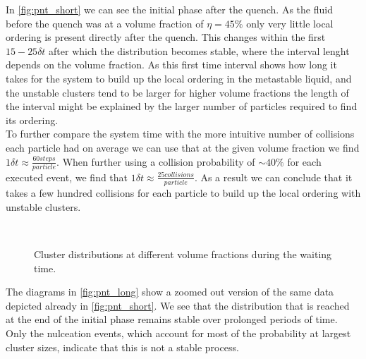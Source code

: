 In \autoref{fig:pnt_short} we can see the initial phase after the quench. As the fluid before the quench was at a volume fraction of $\eta=45\%$ only very little local ordering is present directly after the quench. This changes within the first $15 -25 \delta t$ after which the distribution becomes stable, where the interval lenght depends on the volume fraction. As this first time interval shows how long it takes for the system to build up the local ordering in the metastable liquid, and the unstable clusters tend to be larger for higher volume fractions the length of the interval might be explained by the larger number of particles required to find its ordering.\\ 
To further compare the system time with the more intuitive number of collisions each particle had on average we can use that at the given volume fraction we find  $1\delta t \approx \frac{60 steps}{particle}$. When further using a collision probability of $\sim 40 \%$ for each executed event, we find that $1\delta t \approx \frac{25 collisions}{particle}$. As a result we can conclude that it takes a few hundred collisions for each particle to build up the local ordering with unstable clusters.\\

\begin{figure}[ht]
\begin{center}
 \hspace{0.0cm}
\\
 \hspace{0.0cm}
\caption[Cluster distribution over time for long times]{Cluster distributions at different volume fractions during the waiting time.}
\label{fig:pnt_long}
\end{center}
\end{figure}

The diagrams in \autoref{fig:pnt_long} show a zoomed out version of the same data depicted already in \autoref{fig:pnt_short}. We see that the distribution that is reached at the end of the initial phase remains stable over prolonged periods of time. Only the nulceation events, which account for most of the probability at largest cluster sizes, indicate that this is not a stable process.

